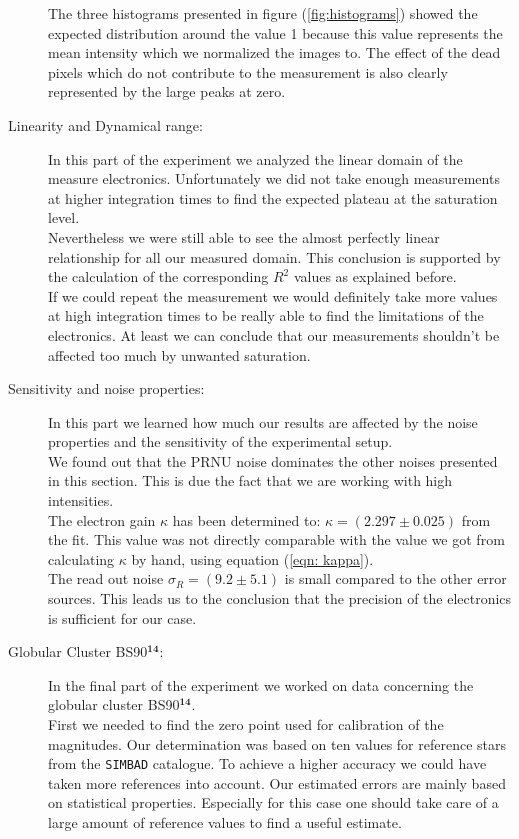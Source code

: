 \begin{description}
	The three histograms presented in figure (\ref{fig:histograms}) showed the expected distribution around the value 1 because this value represents the mean intensity which we normalized the images to. The effect of the dead pixels which do not contribute to the measurement is also clearly represented by the large peaks at zero. 
	\item[Linearity and Dynamical range:] In this part of the experiment we analyzed the linear domain of the measure electronics. Unfortunately we did not take enough measurements at higher integration times to find the expected plateau at the saturation level. \\
	Nevertheless we were still able to see the almost perfectly linear relationship for all our measured domain. This conclusion is supported by the calculation of the corresponding $R^2$ values as explained before. \\
	If we could repeat the measurement we would definitely take more values at high integration times to be really able to find the limitations of the electronics. At least we can conclude that our measurements shouldn't be affected too much by unwanted saturation. 
	\item[Sensitivity and noise properties:] In this part we learned how much our results are affected by the noise properties and the sensitivity of the experimental setup. \\
	We found out that the PRNU noise dominates the other noises presented in this section. This is due the fact that we are working with high intensities.\\
	The electron gain $\kappa$ has been determined to: $\kappa = (2.297 \pm 0.025)$ from the fit. This value was not directly comparable with the value we got from calculating $\kappa$ by hand, using equation (\ref{eqn: kappa}). \\
	The read out noise $\sigma_R = (9.2 \pm 5.1)$ is small compared to the other error sources. This leads us to the conclusion that the precision of the electronics is sufficient for our case.
	\item[Globular Cluster BS90$^{\mathbf{14}}$:] In the final part of the experiment we worked on data concerning the globular cluster BS90$^{\mathbf{14}}$. \\
	First we needed to find the zero point used for calibration of the magnitudes. Our determination was based on ten values for reference stars from the \texttt{SIMBAD} catalogue. To achieve a higher accuracy we could have taken more references into account. Our estimated errors are mainly based on statistical properties. Especially for this case one should take care of a large amount of reference values to find a useful estimate. \\

\end{description}
